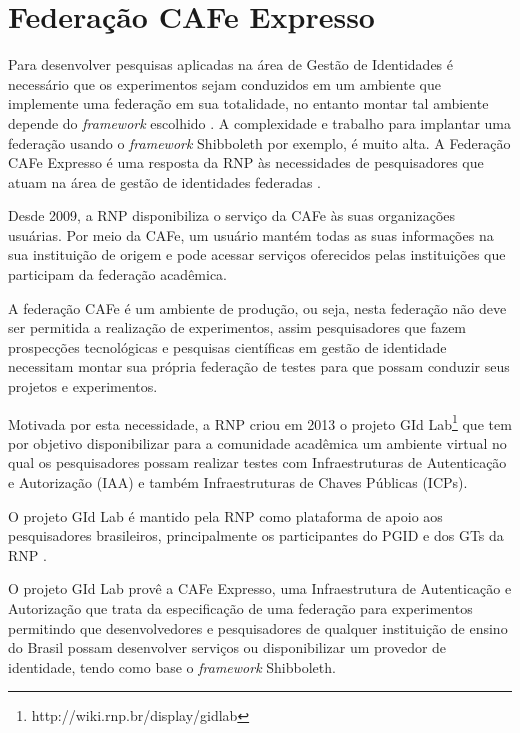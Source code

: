 \chapter{Federação CAFe Expresso}
\label{c_cap4}

Para desenvolver pesquisas aplicadas na área de Gestão de Identidades é necessário que os experimentos sejam conduzidos em um ambiente que implemente uma federação em sua totalidade, no entanto montar tal ambiente depende do \textit{framework} escolhido \cite{wangham:13}. A complexidade e trabalho para implantar uma federação usando o \textit{framework} Shibboleth por exemplo, é muito alta. A Federação CAFe Expresso é uma resposta da RNP às necessidades de pesquisadores que atuam na área de gestão de identidades federadas \cite{wangham:13}.

Desde 2009, a RNP disponibiliza o serviço da \ac{CAFe} às suas organizações usuárias. Por meio da CAFe, um usuário mantém todas as suas informações na sua instituição de origem e pode acessar serviços oferecidos pelas instituições que participam da federação acadêmica.

A federação CAFe é um ambiente de produção, ou seja, nesta federação não deve ser permitida a realização de experimentos, assim pesquisadores que fazem prospecções tecnológicas e pesquisas científicas em gestão de identidade necessitam montar sua própria federação de testes para que possam conduzir seus projetos e experimentos.

Motivada por esta necessidade, a RNP criou em 2013 o projeto \acf{GId Lab}\footnote{http://wiki.rnp.br/display/gidlab} que tem por objetivo disponibilizar para a comunidade acadêmica um ambiente virtual no qual os pesquisadores possam realizar testes com Infraestruturas de Autenticação e Autorização (IAA) e também Infraestruturas de Chaves Públicas (ICPs).

O projeto GId Lab é mantido pela RNP como plataforma de apoio aos pesquisadores brasileiros, principalmente os participantes do \ac{PGID} e dos \acp{GT} da RNP \cite{wangham:13}.

O projeto GId Lab provê a CAFe Expresso, uma Infraestrutura de Autenticação e Autorização que trata da especificação de uma federação para experimentos permitindo que desenvolvedores e pesquisadores de qualquer instituição de ensino do Brasil possam desenvolver serviços ou disponibilizar um provedor de identidade, tendo como base o \textit{framework} Shibboleth.

